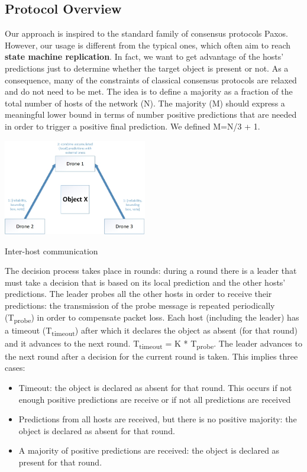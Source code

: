 \documentclass[10pt,conference,compsocconf]{IEEEtran}
\begin{document}
\subsection{Protocol Overview}
\label{subsec:protooverview}
Our approach is inspired to the standard family of consensus protocols Paxos. However, our usage is different from the typical ones, which often aim to reach \textbf{state machine replication}. In fact, we want to get advantage of the hosts' predictions just to determine whether the target object is present or not. As a consequence, many of the constraints of classical consensus protocols are relaxed and do not need to be met. The idea is to define a majority as a fraction of the total number of hosts of the network (N). The majority (M) should express a meaningful lower bound in terms of number positive predictions that are needed in order to trigger a positive final prediction. We defined M=N/3 + 1.
\begin{center}
	\captionsetup{type=figure}
	\includegraphics[width=0.47\textwidth]{img/protocol_sketch_inter_host.jpg}
	\caption {Inter-host communication}
	\label{fig:inter_host}
\end{center}
The decision process takes place in rounds: during a round there is a leader that must take a decision that is based on its local prediction and the other hosts' predictions. The leader probes all the other hosts in order to receive their predictions: the transmission of the probe message is repeated periodically (T\textsubscript{probe}) in order to compensate packet loss. Each host (including the leader) has a timeout (T\textsubscript{timeout}) after which it declares the object as absent (for that round) and it advances to the next round. T\textsubscript{timeout} = K * T\textsubscript{probe}. The leader advances to the next round after a decision for the current round is taken. This implies three cases:
\begin{itemize}
\item Timeout: the object is declared as absent for that round. This occurs if not enough positive predictions are receive or if not all predictions are received
\item Predictions from all hosts are received, but there is no positive majority: the object is declared as absent for that round.
\item A majority of positive predictions are received: the object is declared as present for that round.
\end{itemize}
\end{document}
